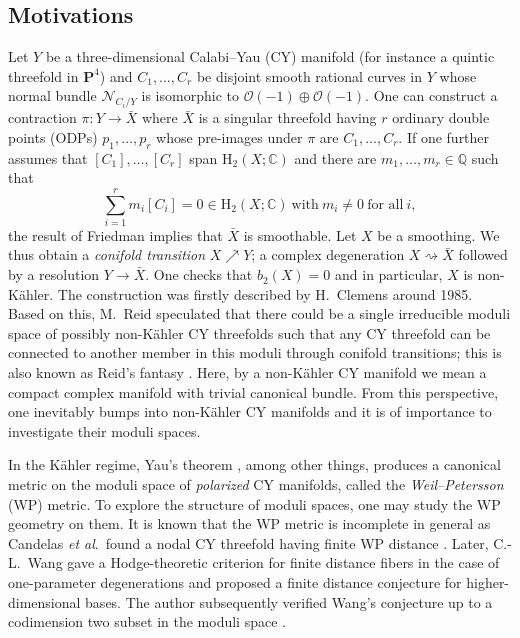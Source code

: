 \subsection{Motivations}
Let \(Y\) be a three-dimensional Calabi--Yau (CY) manifold
(for instance a quintic threefold in \(\mathbf{P}^{4}\))
and \(C_{1},\ldots,C_{r}\) be disjoint smooth rational curves
in \(Y\) whose normal bundle \(\mathcal{N}_{C_{i}\slash Y}\) is
isomorphic to
\(\mathscr{O}(-1)\oplus\mathscr{O}(-1)\).
One can construct
a contraction \(\pi\colon Y\to\bar{X}\) where \(\bar{X}\) is a
singular threefold having
\(r\) ordinary double points (ODPs) \(p_{1},\ldots,p_{r}\)
whose pre-images under \(\pi\) are \(C_{1},\ldots,C_{r}\).
If one further assumes that \([C_{1}],\ldots,[C_{r}]\) span \(\mathrm{H}_{2}(X;\mathbb{C})\)
and there are \(m_{1},\ldots,m_{r}\in\mathbb{Q}\) such that
\begin{equation}
\sum_{i=1}^{r} m_{i} [C_{i}] = 0 \in\mathrm{H}_{2}(X;\mathbb{C})~\mbox{with}~m_{i}\ne 0~\mbox{for all}~i,
\end{equation}
the result of Friedman 
\cite{1986-Friedman-simultaneous-resolution-of-threefold-double-points} implies that
\(\bar{X}\) is smoothable.
Let \(X\) be a smoothing. 
We thus obtain 
a \emph{conifold transition} \(X\nearrow Y\); 
a complex degeneration \(X\rightsquigarrow\bar{X}\) followed by a resolution \(Y\to \bar{X}\). 
One checks that
\(b_{2}(X)=0\) and in particular, \(X\) is non-K\"{a}hler. 
The construction was firstly described by H.~Clemens around 1985. 
Based on this, M.~Reid speculated that there could be a 
single irreducible moduli space of possibly non-K\"{a}hler CY threefolds
such that any CY threefold can be connected to 
another member in this moduli through conifold transitions;
this is also known as Reid's fantasy \cite{1987-Reid-the-moduli-space-of-3-folds-with-k-0-may-nevertheless-be-irreducible}.
Here, by a non-K\"{a}hler CY manifold we mean a compact complex manifold
with trivial canonical bundle.
From this perspective, one inevitably 
bumps into non-K\"{a}hler CY manifolds and it 
is of importance to investigate their moduli spaces.

In the K\"{a}hler regime, 
Yau's theorem \cite{1978-Yau-on-the-ricci-curvature-of-a-compact-kahler-manifold-and-the-complex-monge-ampere-equation-i}, among other things, produces
a canonical metric on the moduli space of \emph{polarized} CY manifolds, 
called the \emph{Weil--Petersson} (WP) metric.
To explore the structure of moduli spaces, one may 
study the WP geometry on them.
It is known that the WP metric is incomplete in general
as Candelas \textit{et al}.~found
a nodal CY threefold having finite WP distance
\cite{1990-Candelas-Green-Hubsch-rolling-among-calabi-yau-vacua}. 
Later, C.-L.~Wang gave a Hodge-theoretic criterion for finite distance fibers
in the case of one-parameter degenerations 
\cites{1997-Wang-on-the-incompleteness-of-the-weil-petersson-metric-along-degenerations-of-calabi-yau-manifolds,2003-Wang-quasi-hodge-metrics-and-canonical-singularities}
and proposed a finite distance conjecture for higher-dimensional bases.
The author subsequently verified Wang's conjecture up to a codimension
two subset in the moduli space
\cite{2018-Lee-a-Hodge-theoretic-criterion-for-finite-WP-degenerations-over-a-higher-dimensional-base}. 


